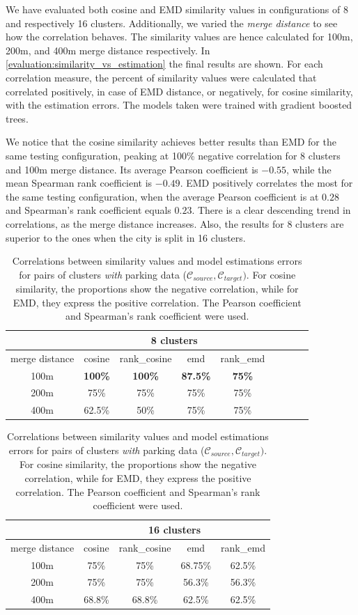 We have evaluated both cosine and EMD similarity values in configurations of 8 and respectively 16 clusters.
Additionally, we varied the \textit{merge distance} to see how the correlation behaves.
The similarity values are hence calculated for 100m, 200m, and 400m merge distance respectively.
In \autoref{evaluation:similarity_vs_estimation} the final results are shown.
For each correlation measure, the percent of similarity values were calculated that correlated positively, in case of EMD distance, or negatively, for cosine similarity, with the estimation errors.
The models taken were trained with gradient boosted trees. 

We notice that the cosine similarity achieves better results than EMD for the same testing configuration, peaking at 100\% negative correlation for 8 clusters and 100m merge distance.
Its average Pearson coefficient is $-0.55$, while the mean Spearman rank coefficient is $-0.49$.
EMD positively correlates the most for the same testing configuration, when the average Pearson coefficient is at $0.28$ and Spearman's rank coefficient equals $0.23$.
There is a clear descending trend in correlations, as the merge distance increases.  Also, the results for 8 clusters are superior to the ones when the city is split in 16 clusters.

\begin{table}[!ht]
	\centering
	\small
	\begin{tabular}{ | c | c | c | c | c | c | c | c | c |}
		\hline
		{} & \multicolumn{4}{c|}{8 clusters} \\ \hline
		{merge distance} & cosine & rank\_cosine & emd & rank\_emd \\ \hline
		100m & \textbf{100\%} & \textbf{100\%} & \textbf{87.5\%} & \textbf{75\%} \\ \hline
		200m & 75\% & 75\% & 75\% & 75\% \\ \hline
		400m & 62.5\% & 50\% & 75\% & 75\% \\ \hline
	\end{tabular}%
	\vspace{3em}
	\begin{tabular}{ | c | c | c | c | c | }
		\hline
		{} & \multicolumn{4}{c|}{16 clusters} \\ \hline
		{merge distance} & cosine & rank\_cosine & emd & rank\_emd \\ \hline
		100m & 75\% & 75\% & 68.75\% & 62.5\% \\ \hline
		200m & 75\% & 75\% & 56.3\% & 56.3\% \\ \hline
		400m & 68.8\% & 68.8\% & 62.5\% & 62.5\% \\ \hline
	\end{tabular}
	
	\caption{Correlations between similarity values and model estimations errors for pairs of clusters \textit{with} parking data ($\mathcal{C}_{source}, \mathcal{C}_{target})$.
For cosine similarity, the proportions show the negative correlation, while for EMD, they express the positive correlation.
The Pearson coefficient and Spearman's rank coefficient were used. }
	\label{evaluation:similarity_vs_estimation}
\end{table}	


